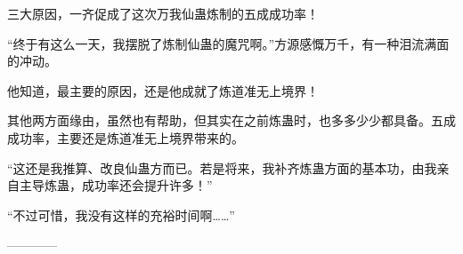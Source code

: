 \begin{this_body}
三大原因，一齐促成了这次万我仙蛊炼制的五成成功率！

“终于有这么一天，我摆脱了炼制仙蛊的魔咒啊。”方源感慨万千，有一种泪流满面的冲动。

他知道，最主要的原因，还是他成就了炼道准无上境界！

其他两方面缘由，虽然也有帮助，但其实在之前炼蛊时，也多多少少都具备。五成成功率，主要还是炼道准无上境界带来的。

“这还是我推算、改良仙蛊方而已。若是将来，我补齐炼蛊方面的基本功，由我亲自主导炼蛊，成功率还会提升许多！”

“不过可惜，我没有这样的充裕时间啊……”

------------

\end{this_body}

